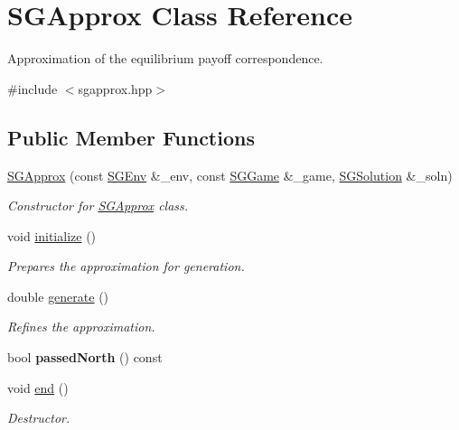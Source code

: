 \hypertarget{classSGApprox}{\section{S\-G\-Approx Class Reference}
\label{classSGApprox}
}


Approximation of the equilibrium payoff correspondence.  




{\ttfamily \#include $<$sgapprox.\-hpp$>$}

\subsection*{Public Member Functions}
\begin{DoxyCompactItemize}
\item 
\hypertarget{classSGApprox_a765c3c57b31d813ced0f7f93f6d4bb11}{\hyperlink{classSGApprox_a765c3c57b31d813ced0f7f93f6d4bb11}{S\-G\-Approx} (const \hyperlink{classSGEnv}{S\-G\-Env} \&\-\_\-env, const \hyperlink{classSGGame}{S\-G\-Game} \&\-\_\-game, \hyperlink{classSGSolution}{S\-G\-Solution} \&\-\_\-soln)}\label{classSGApprox_a765c3c57b31d813ced0f7f93f6d4bb11}

\begin{DoxyCompactList}\small\item\em Constructor for \hyperlink{classSGApprox}{S\-G\-Approx} class. \end{DoxyCompactList}\item 
void \hyperlink{classSGApprox_a4bca21d3b688b3ca283c6778c593563a}{initialize} ()
\begin{DoxyCompactList}\small\item\em Prepares the approximation for generation. \end{DoxyCompactList}\item 
double \hyperlink{classSGApprox_ac32645eb1ff336044f7ee5d523c610ce}{generate} ()
\begin{DoxyCompactList}\small\item\em Refines the approximation. \end{DoxyCompactList}\item 
\hypertarget{classSGApprox_a1099ea54bfba9b78417bec9b7f2751fc}{bool {\bfseries passed\-North} () const }\label{classSGApprox_a1099ea54bfba9b78417bec9b7f2751fc}

\item 
void \hyperlink{classSGApprox_af4ec568399b6e3ae16e6087d02381c12}{end} ()
\begin{DoxyCompactList}\small\item\em Destructor. \end{DoxyCompactList}\end{DoxyCompactItemize}
